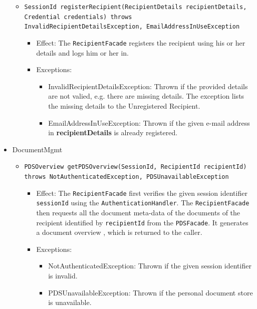 \documentclass[a4paper,10pt]{article}
\begin{document}
\begin{itemize}
\begin{itemize}
         \item \texttt{SessionId registerRecipient(RecipientDetails recipientDetails, Credential credentials) throws InvalidRecipientDetailsException, EmailAddressInUseException}
            \begin{itemize}
                \item Effect: The \texttt{RecipientFacade} registers the recipient using his or her details and logs him or her in.
                \item Exceptions: 
                \begin{itemize}
                	\item InvalidRecipientDetailsException: Thrown if the provided details are not valied, e.g. there are missing details. The exception lists the missing details to the Unregistered Recipient.
                	\item EmailAddressInUseException: Thrown if the given e-mail address in \textbf{recipientDetails} is already registered.
                \end{itemize}
            \end{itemize}           
            
        \end{itemize}
    

    \item DocumentMgmt
    \begin{itemize}
        \item \texttt{PDSOverview getPDSOverview(SessionId, RecipientId recipientId)\\ throws NotAuthenticatedException, PDSUnavailableException}
        \begin{itemize}
            \item Effect: The \texttt{RecipientFacade} first verifies the given session identifier \texttt{sessionId} using the \texttt{AuthenticationHandler}. The \texttt{RecipientFacade} then requests all the document meta-data of the documents of the recipient identified by \texttt{recipientId} from the \texttt{PDSFacade}. It generates a document overview , which is returned  to the caller.
            \item Exceptions:
             \begin{itemize}
                \item NotAuthenticatedException: Thrown if the given session identifier is invalid.
                \item PDSUnavailableException: Thrown if the personal document store is unavailable.
            \end{itemize}       	
        \end{itemize}
      

\end{itemize}
\end{itemize}
\end{document}
